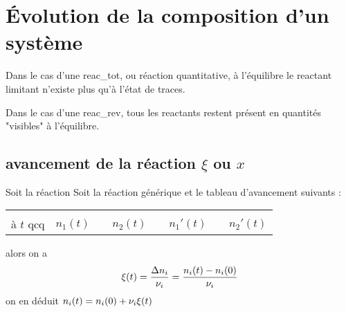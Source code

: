 \section{\'Evolution de la composition d'un système}
Dans le cas d'une \gls{reac_tot}, ou réaction quantitative, à l'équilibre le \gls{reactant} limitant n'existe plus qu'à l'état de traces.

Dans le cas d'une \gls{reac_rev}, tous les \glspl{reactant} restent présent en quantités "visibles" à l'équilibre.

\subsection{\Gls{avancement} de la réaction $\xi$ ou $x$}

Soit la réaction 
Soit la réaction générique et le tableau d'avancement suivants :
\begin{center}
	\begin{tabular}{cccccccc}
		&\reacStdTab{}\\[0.1cm]
		à $t$ qcq & $n_1(t)$ && $n_2(t)$ && $n_1'(t)$ && $n_2'(t)$\\
	\end{tabular}
\end{center}
alors on a
$$\xi(t) = \frac{\Delta n_i}{\nu_i} = \frac{n_i(t) - n_i(0)}{\nu_i}$$
on en déduit $n_i(t) = n_i(0) + \nu_i \xi (t)$